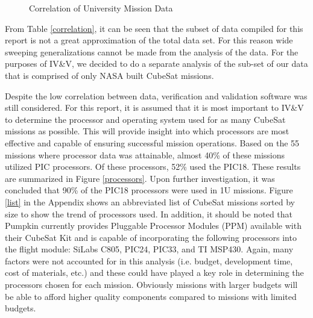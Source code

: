 \documentclass[11pt]{article}
\begin{document}
\begin{figure}[ht!]
\centering
{}
\caption{Correlation of University Mission Data}
\label{university}
\end{figure}

From Table \ref{correlation}, it can be seen that the subset of data compiled for this report is not a great approximation of the total data set.  For this reason wide sweeping generalizations cannot be made from the analysis of the data. For the purposes of IV\&V, we decided to do a separate analysis of the sub-set of our data that is comprised of only NASA built CubeSat missions. 

Despite the low correlation between data, verification and validation software was still considered.  For this report, it is assumed that it is most important to IV\&V to determine the processor and operating system used for as many CubeSat missions as possible.  This will provide insight into which processors are most effective and capable of ensuring successful mission operations.  Based on the 55 missions where processor data was attainable, almost 40\% of these missions utilized PIC processors.  Of these processors, 52\% used the PIC18.  These results are summarized in Figure \ref{processors}.  Upon further investigation, it was concluded that 90\% of the PIC18 processors were used in 1U missions.  Figure \ref{list} in the Appendix shows an abbreviated list of CubeSat missions sorted by size to show the trend of processors used.  In addition, it should be noted that Pumpkin currently provides Pluggable Processor Modules (PPM) available with their CubeSat Kit and is capable of incorporating the following processors into the flight module:  SiLabs C805, PIC24, PIC33, and TI MSP430.  Again, many factors were not accounted for in this analysis (i.e. budget, development time, cost of materials, etc.) and these could have played a key role in determining the processors chosen for each mission.  Obviously missions with larger budgets will be able to afford higher quality components compared to missions with limited budgets.
\end{document}
